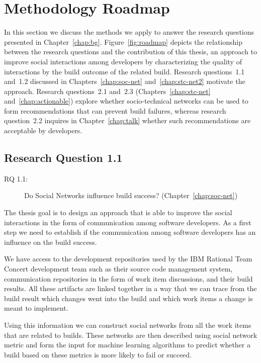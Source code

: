 \section{Methodology Roadmap}
\label{c5:sec:roadmap}
In this section we discuss the methods we apply to answer the research questions presented in Chapter~\ref{chap:bg}.
Figure~\ref{fig:roadmap} depicts the relationship between the research questions and the contribution of this thesis, an approach to improve social interactions among developers by characterizing the quality of interactions by the build outcome of the related build.
Research questions~1.1 and~1.2 discussed in Chapters~\ref{chap:soc-net} and~\ref{chap:stc-net2} motivate the approach.
Research questions~2.1 and~2.3 (Chapters~\ref{chap:stc-net} and~\ref{chap:actionable}) explore whether socio-technical networks can be used to form recommendations that can prevent build failures, whereas research question~2.2 inquires in Chapter~\ref{chap:talk} whether such recommendations are acceptable by developers.

\subsection{Research Question 1.1}
\begin{description}
  \item[RQ 1.1:] Do Social Networks influence build success? (Chapter~\ref{chap:soc-net})
\end{description}
The thesis goal is to design an approach that is able to improve the social interactions in the form of communication among software developers.
As a first step we need to establish if the communication among software developers has an influence on the build success.

We have access to the development repositories used by the IBM Rational Team Concert development team such as their source code management system, communication repositories in the form of work item discussions, and their build results.
All these artifacts are linked together in a way that we can trace from the build result which changes went into the build and which work items a change is meant to implement.

Using this information we can construct social networks from all the work items that are related to builds.
These networks are then described using social network metric and form the input for machine learning algorithms to predict whether a build based on these metrics is more likely to fail or succeed.

